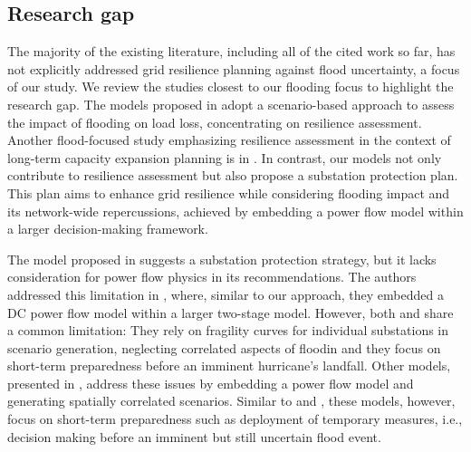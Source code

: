 \documentclass[authoryear,preprint,review,12pt]{elsarticle}\usepackage{amssymb}
\begin{document}
\subsection{Research gap}
The majority of the existing literature, including all of the cited work so far, has not explicitly addressed grid resilience planning against flood uncertainty, a focus of our study. We review the studies closest to our flooding focus to highlight the research gap. The models proposed in 
\cite{9695371} adopt a scenario-based approach to assess the impact of flooding on load loss, concentrating on resilience assessment. Another flood-focused study emphasizing resilience assessment in the context of long-term capacity expansion planning is in \cite{SAHIN2025110892}. In contrast, our models not only contribute to resilience assessment but also propose a substation protection plan. This plan aims to enhance grid resilience while considering flooding impact and its network-wide repercussions, achieved by embedding a power flow model within a larger decision-making framework. 

The model proposed in \cite{Mohadese} suggests a substation protection strategy, but it lacks consideration for power flow physics in its recommendations. The authors addressed this limitation in \cite{10287582}, where, similar to our approach, they embedded a DC power flow model within a larger two-stage model. However, both \cite{Mohadese} and \cite{10287582} share a common limitation: They rely on fragility curves for individual substations in scenario generation, neglecting correlated aspects of floodin and they focus on short-term preparedness before an imminent hurricane's landfall. Other models, presented in \cite{9916992, austgen_iise_2025, yip_ieee_access_mobile}, address these issues by embedding a power flow model and generating spatially correlated scenarios. Similar to \cite{Mohadese} and \cite{10287582}, these models, however, focus on short-term preparedness such as deployment of temporary measures, i.e., decision making before an imminent but still uncertain flood event.
\end{document}
